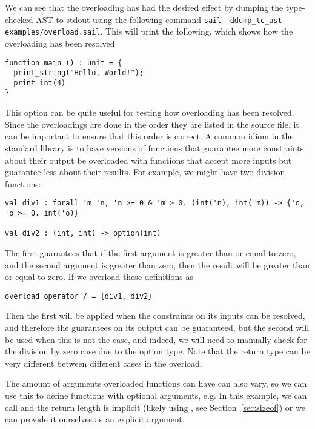 

We can see that the overloading has had the desired effect by dumping
the type-checked AST to stdout using the following command
\verb+sail -ddump_tc_ast examples/overload.sail+. This will print the
following, which shows how the overloading has been resolved
\begin{lstlisting}
function main () : unit = {
  print_string("Hello, World!");
  print_int(4)
}
\end{lstlisting}
This option can be quite useful for testing how overloading has been
resolved. Since the overloadings are done in the order they are listed
in the source file, it can be important to ensure that this order is
correct. A common idiom in the standard library is to have versions of
functions that guarantee more constraints about their output be
overloaded with functions that accept more inputs but guarantee less
about their results. For example, we might have two division functions:
\begin{lstlisting}
val div1 : forall 'm 'n, 'n >= 0 & 'm > 0. (int('n), int('m)) -> {'o, 'o >= 0. int('o)}

val div2 : (int, int) -> option(int)
\end{lstlisting}
The first guarantees that if the first argument is greater than or
equal to zero, and the second argument is greater than zero, then the
result will be greater than or equal to zero. If we overload these
definitions as
\begin{lstlisting}
overload operator / = {div1, div2}
\end{lstlisting}
Then the first will be applied when the constraints on its inputs can
be resolved, and therefore the guarantees on its output can be
guaranteed, but the second will be used when this is not the case, and
indeed, we will need to manually check for the division by zero case
due to the option type. Note that the return type can be very
different between different cases in the overload.

The amount of arguments overloaded functions can have can also vary,
so we can use this to define functions with optional arguments, e.g.
 In this example, we can call
 and the return length is implicit (likely using
, see Section~\ref{sec:sizeof}) or we can provide it
ourselves as an explicit argument.


